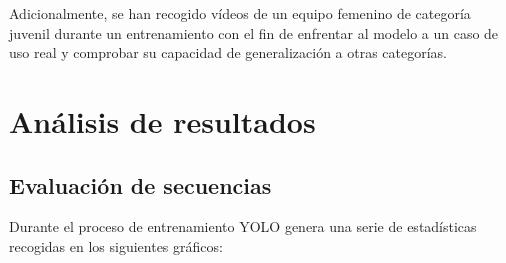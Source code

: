 \documentclass[12pt]{report} %
\begin{document}
    Adicionalmente, se han recogido vídeos de un equipo femenino de categoría
    juvenil durante un entrenamiento con el fin de enfrentar al modelo a un
    caso de uso real y comprobar su capacidad de generalización a otras categorías.
%
%
%
%
%
%

    \chapter{Análisis de resultados}
    \label{chap:resultados}

    \section{Evaluación de secuencias}

    Durante el proceso de entrenamiento YOLO genera una serie de estadísticas
    recogidas en los siguientes gráficos:
\end{document}

